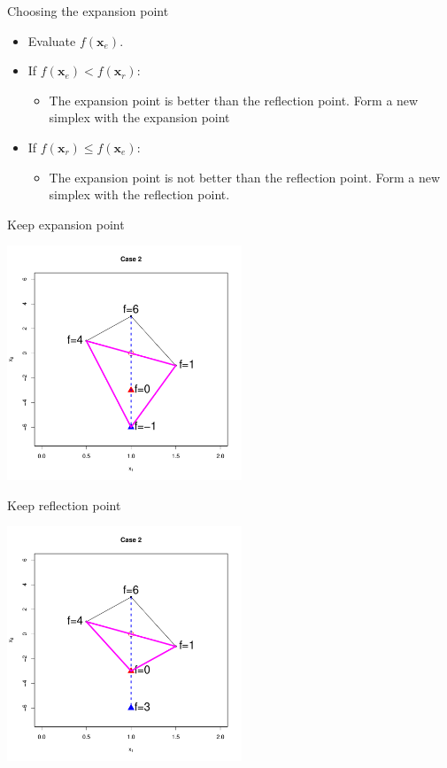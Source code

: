 \documentclass[10pt]{beamer}
\begin{document}
\begin{frame}{Choosing the expansion point}
  \begin{itemize}
  \item Evaluate $f({\bm x_e})$.

  \item If $f({\bm x_e})<f({\bm x_r})$:
    \begin{itemize}
    \item The expansion point is better than the reflection point. Form a new simplex with the expansion point
    \end{itemize}

  \item If $f({\bm x_r})\leq f({\bm x_e})$:
    \begin{itemize}
    \item The expansion point is not better than the reflection point. Form a new simplex with the reflection point.
    \end{itemize}
  \end{itemize}
\end{frame}
\begin{frame}{Keep expansion point}
  \begin{center}
    \includegraphics[height=7cm]{RCode/nmexpansion3.pdf}
  \end{center}
\end{frame}
\begin{frame}{Keep reflection point}
  \begin{center}
    \includegraphics[height=7cm]{RCode/nmexpansion4.pdf}
  \end{center}
\end{frame}
\end{document}
